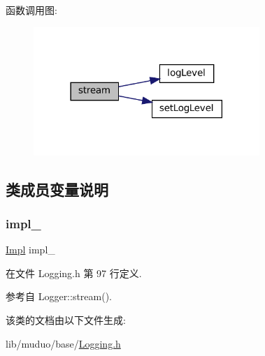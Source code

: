 函数调用图\+:
\nopagebreak
\begin{figure}[H]
\begin{center}
\leavevmode
\includegraphics[width=242pt]{classmuduo_1_1Logger_af35f1ce6f7021612044983efed7fc89e_cgraph}
\end{center}
\end{figure}


\subsection{类成员变量说明}
\mbox{\label{classmuduo_1_1Logger_a21911ce5df42a8fac765ff5c446bee64}} 
\subsubsection{\texorpdfstring{impl\+\_\+}{impl\_}}
{\footnotesize\ttfamily \hyperlink{classmuduo_1_1Logger_1_1Impl}{Impl} impl\+\_\+\hspace{0.3cm}{\ttfamily [private]}}



在文件 Logging.\+h 第 97 行定义.



参考自 Logger\+::stream().



该类的文档由以下文件生成\+:\begin{DoxyCompactItemize}
\item 
lib/muduo/base/\hyperlink{Logging_8h}{Logging.\+h}\end{DoxyCompactItemize}

